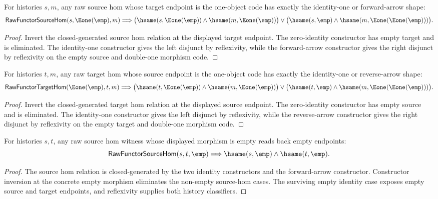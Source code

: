 \begin{theorem}
\label{thm:raw-functor-source-hom-target-one-morphism-cases}
For histories $s,m$, any raw source hom whose target endpoint is the one-object
code has exactly the identity-one or forward-arrow shape:
$$
\mathsf{RawFunctorSourceHom}(s,\Eone(\emp),m)
\Longrightarrow
\bigl(\hsame(s,\Eone(\emp))\land\hsame(m,\Eone(\emp))\bigr)
\vee
\bigl(\hsame(s,\emp)\land\hsame(m,\Eone(\Eone(\emp)))\bigr).
$$
\end{theorem}
\begin{proof}
Invert the closed-generated source hom relation at the displayed target
endpoint. The zero-identity constructor has empty target and is eliminated.
The identity-one constructor gives the left disjunct by reflexivity, while the
forward-arrow constructor gives the right disjunct by reflexivity on the empty
source and double-one morphism code.
\end{proof}

\begin{theorem}
\label{thm:raw-functor-target-hom-source-one-morphism-cases}
For histories $t,m$, any raw target hom whose source endpoint is the one-object
code has exactly the identity-one or reverse-arrow shape:
$$
\mathsf{RawFunctorTargetHom}(\Eone(\emp),t,m)
\Longrightarrow
\bigl(\hsame(t,\Eone(\emp))\land\hsame(m,\Eone(\emp))\bigr)
\vee
\bigl(\hsame(t,\emp)\land\hsame(m,\Eone(\Eone(\emp)))\bigr).
$$
\end{theorem}
\begin{proof}
Invert the closed-generated target hom relation at the displayed source
endpoint. The zero-identity constructor has empty source and is eliminated.
The identity-one constructor gives the left disjunct by reflexivity, while the
reverse-arrow constructor gives the right disjunct by reflexivity on the empty
target and double-one morphism code.
\end{proof}

\begin{theorem}
\label{thm:raw-functor-source-hom-empty-morphism-endpoint-readback}
For histories $s,t$, any raw source hom witness whose displayed morphism is
empty reads back empty endpoints:
$$
\mathsf{RawFunctorSourceHom}(s,t,\emp)
\Longrightarrow
\hsame(s,\emp)\land\hsame(t,\emp).
$$
\end{theorem}
\begin{proof}
The source hom relation is closed-generated by the two identity constructors
and the forward-arrow constructor. Constructor inversion at the concrete empty
morphism eliminates the non-empty source-hom cases. The surviving empty
identity case exposes empty source and target endpoints, and reflexivity
supplies both history classifiers.
\end{proof}


